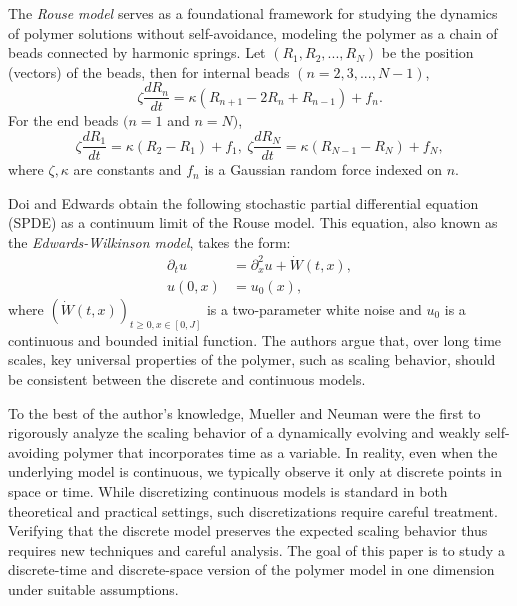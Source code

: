 \documentclass[12pt]{amsart}
\numberwithin{equation}{section}
\newcommand{\1}{\mathbf{1}}
\begin{document}
The \textit{Rouse model} \cite{rouse1953theory} serves as a foundational framework for studying the dynamics of polymer solutions without self-avoidance, modeling the polymer as a chain of beads connected by harmonic springs. Let $(R_1,R_2,...,R_N)$ be the position (vectors) of the beads, then for internal beads $(n=2,3,...,N-1)$,
\begin{equation*}
\zeta\frac{dR_n}{dt} = \kappa(R_{n+1}-2R_n+R_{n-1})+f_n.
\end{equation*}
For the end beads $(n=1$ and $n=N)$,
\begin{equation*}
\zeta\frac{dR_1}{dt} = \kappa(R_{2}-R_{1})+f_1,~\zeta\frac{dR_N}{dt} = \kappa(R_{N-1}-R_{N})+f_N,
\end{equation*}
where $\zeta,\kappa$ are constants and $f_n$ is a Gaussian random force indexed on $n$.

Doi and Edwards \cite{doi1988theory} obtain the following stochastic partial differential equation (SPDE) as a continuum limit of the Rouse model. This equation, also known as the \textit{Edwards-Wilkinson model}, takes the form:
\begin{equation*}
\begin{split}
\partial_tu&=\partial^2_xu+\dot{W}(t,x),\\
u(0,x) &= u_0(x),
\end{split}
\end{equation*}
where $(\dot{W}(t,x))_{t\ge0,x\in[0,J]}$ is a two-parameter white noise and $u_0$ is a continuous and bounded initial function. The authors argue that, over long time scales, key universal properties of the polymer, such as scaling behavior, should be consistent between the discrete and continuous models. 

To the best of the author's knowledge, Mueller and Neuman \cite{mueller2022scaling} were the first to rigorously analyze the scaling behavior of a dynamically evolving and weakly self-avoiding polymer that incorporates time as a variable. In reality, even when the underlying model is continuous, we typically observe it only at discrete points in space or time. While discretizing continuous models is standard in both theoretical and practical settings, such discretizations require careful treatment. Verifying that the discrete model preserves the expected scaling behavior thus requires new techniques and careful analysis. The goal of this paper is to study a discrete-time and discrete-space version of the polymer model in one dimension under suitable assumptions.
\end{document}
